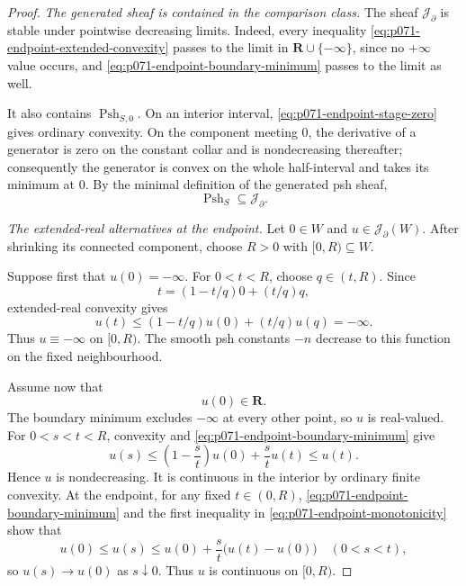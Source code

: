 \begin{proof}
\medskip\noindent\emph{The generated sheaf is contained in the comparison
class.}
The sheaf \(\mathscr J_{\partial}\) is stable under pointwise decreasing
limits.  Indeed, every inequality
\eqref{eq:p071-endpoint-extended-convexity} passes to the limit in
\(\mathbf R\cup\{-\infty\}\), since no \(+\infty\) value occurs, and
\eqref{eq:p071-endpoint-boundary-minimum} passes to the limit as well.

It also contains \(\operatorname{Psh}_{S,0}\).  On an interior interval,
\eqref{eq:p071-endpoint-stage-zero} gives ordinary convexity.  On the
component meeting \(0\), the derivative of a generator is zero on the
constant collar and is nondecreasing thereafter; consequently the
generator is convex on the whole half-interval and takes its minimum at
\(0\).  By the minimal definition of the generated psh sheaf,
\begin{equation}
                       \operatorname{Psh}_S
                       \subseteq\mathscr J_{\partial}.
 \label{eq:p071-endpoint-generated-in-jensen}
\end{equation}

\medskip\noindent\emph{The extended-real alternatives at the endpoint.}
Let \(0\in W\) and \(u\in\mathscr J_{\partial}(W)\).  After shrinking its
connected component, choose \(R>0\) with \([0,R)\subseteq W\).

Suppose first that \(u(0)=-\infty\).  For \(0<t<R\), choose
\(q\in(t,R)\).  Since
\[
                         t=(1-t/q)0+(t/q)q,
\]
extended-real convexity gives
\[
 u(t)\leq(1-t/q)u(0)+(t/q)u(q)=-\infty.
\]
Thus \(u\equiv-\infty\) on \([0,R)\).  The smooth psh constants \(-n\)
decrease to this function on the fixed neighbourhood.

Assume now that
\begin{equation}
                              u(0)\in\mathbf R.
 \label{eq:p071-endpoint-finite-value}
\end{equation}
The boundary minimum excludes \(-\infty\) at every other point, so \(u\)
is real-valued.  For \(0<s<t<R\), convexity and
\eqref{eq:p071-endpoint-boundary-minimum} give
\begin{equation}
 u(s)
 \leq\left(1-\frac{s}{t}\right)u(0)+\frac{s}{t}u(t)
 \leq u(t).
 \label{eq:p071-endpoint-monotonicity}
\end{equation}
Hence \(u\) is nondecreasing.  It is continuous in the interior by
ordinary finite convexity.  At the endpoint, for any fixed \(t\in(0,R)\),
\eqref{eq:p071-endpoint-boundary-minimum} and the first inequality in
\eqref{eq:p071-endpoint-monotonicity} show that
\[
 u(0)\leq u(s)
 \leq u(0)+\frac{s}{t}\bigl(u(t)-u(0)\bigr)
 \quad(0<s<t),
\]
so \(u(s)\to u(0)\) as \(s\downarrow0\).  Thus \(u\) is continuous on
\([0,R)\).


\end{proof}

